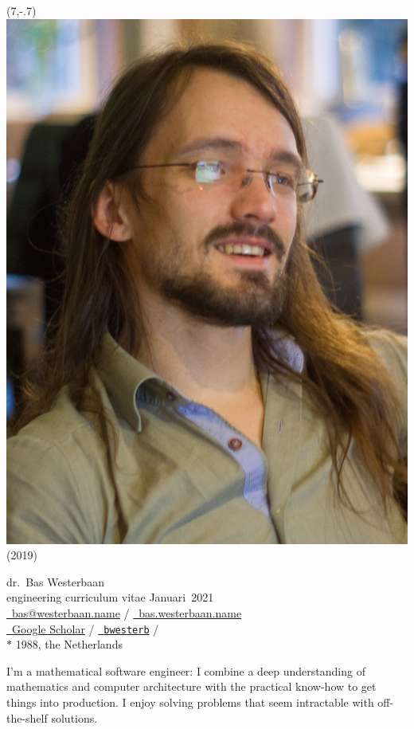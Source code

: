 \documentclass[a4page]{article}
\newcommand\hsep{ {\color{gray}/} }
\begin{document}
\begin{textblock}{2}(7,-.7)
    \noindent
\includegraphics[width=\textwidth]{me}
        \footnotesize(2019)
\end{textblock}\noindent
\textsf{\Large dr.~Bas Westerbaan}\\
engineering curriculum vitae Januari~2021\\

\noindent
\href{mailto:bas@westerbaan.name}{\faEnvelopeO\ bas@westerbaan.name} \hsep
\href{https://bas.westerbaan.name}{\faExternalLink\ bas.westerbaan.name}\\
\href{https://scholar.google.nl/citations?user=AN7BEa8AAAAJ}{%
    \faGraduationCap\ Google Scholar}
    \hsep \href{https://github.com/bwesterb}{\faGithub\ \texttt{bwesterb}}
    \hsep \href{https://www.linkedin.com/in/baswesterbaan/}{\faLinkedinSquare} \\
$*$ 1988, the Netherlands

\vskip0.3cm\noindent
I'm a mathematical software engineer: I combine a deep understanding
    of mathematics and computer architecture
    with the practical know-how to get things into production.
    I enjoy solving  problems that seem intractable
        with off-the-shelf solutions.
\end{document}

